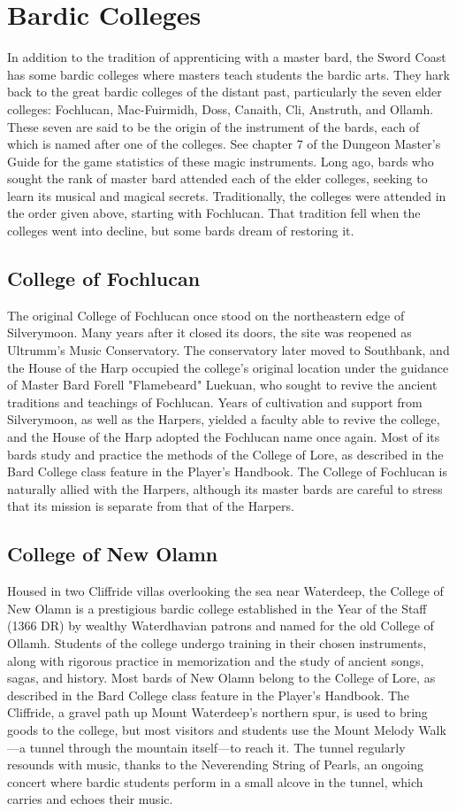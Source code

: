 \documentclass[10pt,a4paper,twoside,twocolumn,openany,bg=print,nodeprecatedcode]{dndbook}
\begin{document}
\section{Bardic Colleges}
In addition to the tradition of apprenticing with a master bard, the Sword Coast has some bardic colleges where masters teach students the bardic arts. They hark back to the great bardic colleges of the distant past, particularly the seven elder colleges: Fochlucan, Mac-Fuirmidh, Doss, Canaith, Cli, Anstruth, and Ollamh. These seven are said to be the origin of the instrument of the bards, each of which is named after one of the colleges. See chapter 7 of the Dungeon Master's Guide for the game statistics of these magic instruments.
Long ago, bards who sought the rank of master bard attended each of the elder colleges, seeking to learn its musical and magical secrets. Traditionally, the colleges were attended in the order given above, starting with Fochlucan. That tradition fell when the colleges went into decline, but some bards dream of restoring it.
\subsection{College of Fochlucan}
The original College of Fochlucan once stood on the northeastern edge of Silverymoon. Many years after it closed its doors, the site was reopened as Ultrumm's Music Conservatory. The conservatory later moved to Southbank, and the House of the Harp occupied the college's original location under the guidance of Master Bard Forell "Flamebeard" Luekuan, who sought to revive the ancient traditions and teachings of Fochlucan. Years of cultivation and support from Silverymoon, as well as the Harpers, yielded a faculty able to revive the college, and the House of the Harp adopted the Fochlucan name once again. Most of its bards study and practice the methods of the College of Lore, as described in the Bard College class feature in the Player's Handbook.
The College of Fochlucan is naturally allied with the Harpers, although its master bards are careful to stress that its mission is separate from that of the Harpers.
\subsection{College of New Olamn}
Housed in two Cliffride villas overlooking the sea near Waterdeep, the College of New Olamn is a prestigious bardic college established in the Year of the Staff (1366 DR) by wealthy Waterdhavian patrons and named for the old College of Ollamh. Students of the college undergo training in their chosen instruments, along with rigorous practice in memorization and the study of ancient songs, sagas, and history. Most bards of New Olamn belong to the College of Lore, as described in the Bard College class feature in the Player's Handbook.
The Cliffride, a gravel path up Mount Waterdeep's northern spur, is used to bring goods to the college, but most visitors and students use the Mount Melody Walk—a tunnel through the mountain itself—to reach it. The tunnel regularly resounds with music, thanks to the Neverending String of Pearls, an ongoing concert where bardic students perform in a small alcove in the tunnel, which carries and echoes their music.
\end{document}
